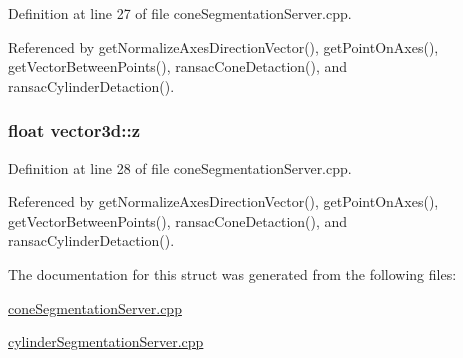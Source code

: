 Definition at line 27 of file cone\-Segmentation\-Server.\-cpp.



Referenced by get\-Normalize\-Axes\-Direction\-Vector(), get\-Point\-On\-Axes(), get\-Vector\-Between\-Points(), ransac\-Cone\-Detaction(), and ransac\-Cylinder\-Detaction().

\hypertarget{structvector3d_a4e5e948ffcf14e91ebec29e889ced5be}{
\subsubsection[{z}]{\setlength{\rightskip}{0pt plus 5cm}float vector3d\-::z}}\label{structvector3d_a4e5e948ffcf14e91ebec29e889ced5be}


Definition at line 28 of file cone\-Segmentation\-Server.\-cpp.



Referenced by get\-Normalize\-Axes\-Direction\-Vector(), get\-Point\-On\-Axes(), get\-Vector\-Between\-Points(), ransac\-Cone\-Detaction(), and ransac\-Cylinder\-Detaction().



The documentation for this struct was generated from the following files\-:\begin{DoxyCompactItemize}
\item 
\hyperlink{coneSegmentationServer_8cpp}{cone\-Segmentation\-Server.\-cpp}\item 
\hyperlink{cylinderSegmentationServer_8cpp}{cylinder\-Segmentation\-Server.\-cpp}\end{DoxyCompactItemize}
